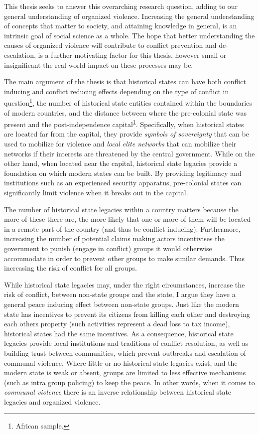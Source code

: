 
This thesis seeks to answer this overarching research question, adding to our
general understanding of organized violence. Increasing the general
understanding of concepts that matter to society, and attaining knowledge in
general, is an intrinsic goal of social science as a whole. The hope that better
understanding the causes of organized violence will contribute to conflict
prevention and de-escalation, is a further motivating factor for this thesis,
however small or insignificant the real world impact on these processes may be.

The main argument of the thesis is that historical states can have both conflict
inducing and conflict reducing effects depending on the type of conflict in
question\footnote{\label{note1}African sample.}, the number of historical state
entities contained within the boundaries of modern countries, and the distance
between where the pre-colonial state was present and the post-independence
capital\textsuperscript{\ref{note1}}. Specifically, when historical states
are located far from the capital, they provide \textit{symbols of
sovereignty} that can be used to mobilize for violence and \textit{local elite
networks} that can mobilize their networks if their
interests are threatened by the central government. While on the other hand, when
located near the capital, historical state legacies provide a foundation on
which modern states can be built. By providing legitimacy and institutions
such as an experienced security apparatus, pre-colonial states can significantly
limit violence when it breaks out in the capital.

The number of historical state legacies within a country matters because the
more of these there are, the more likely that one or more of them will be
located in a remote part of the country (and thus be conflict inducing).
Furthermore, increasing the number of potential claims making actors
incentivises the government to punish (engage in conflict) groups it would
otherwise accommodate in order to prevent other groups to make similar
demands. Thus increasing the risk of conflict for all groups.

While historical state legacies may, under the right circumstances, increase the
risk of conflict, between non-state groups and the state, I argue they have a
general peace inducing effect between non-state groups. Just like the modern
state has incentives to prevent its citizens from killing each other and
destroying each others property (such activities represent a dead loss to tax
income), historical states had the same incentives. As a consequence, historical
state legacies provide local institutions and traditions of conflict resolution,
as well as building trust between communities, which prevent outbreaks and
escalation of communal violence. Where little or no historical state legacies
exist, and the modern state is weak or absent, groups are limited to less
effective mechanisms (such as intra group policing) to keep the peace. In other
words, when it comes to \textit{communal violence} there is an inverse
relationship between historical state legacies and organized violence.

